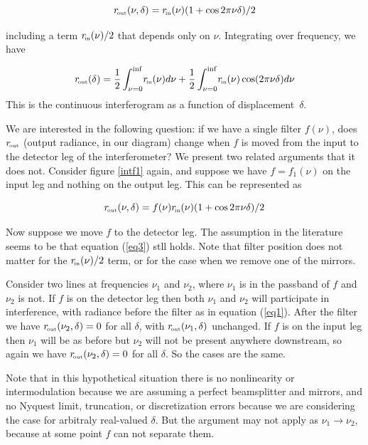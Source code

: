 \documentclass[12pt]{article}
\begin{document}
\begin{equation}\label{eq1}
  r_{\!\mbox{\tiny out}}(\nu,\delta) = r_{\!\mbox{\tiny in}}(\nu)(1+\cos 2\pi\nu\delta)/2
\end{equation}

\noindent
including a term $r_{\!\mbox{\tiny in}}(\nu)/2$ that depends only on $\nu$.
Integrating over frequency, we have

\begin{equation}\label{eq2}
  r_{\!\mbox{\tiny out}}(\delta) = \frac{1}{2}\int_{\nu=0}^{\inf}\!r_{\!\mbox{\tiny in}}(\nu)d\nu + 
     \frac{1}{2}\int_{\nu=0}^{\inf}\!r_{\!\mbox{\tiny in}}(\nu)\cos(2\pi\nu\delta)d\nu
\end{equation}
\noindent
This is the continuous interferogram as a function of
displacement~$\delta$.  

We are interested in the following question: if we have a single
filter $f(\nu)$, does $r_{\!\mbox{\tiny out}}$ (output radiance, in our diagram)
change when $f$ is moved from the input to the detector leg of the
interferometer?  We present two related arguments that it does not.
Consider figure \ref{intf1} again, and suppose we have $f =
f_1(\nu)$ on the input leg and nothing on the output leg.  This can
be represented as

\begin{equation}\label{eq3}
  r_{\!\mbox{\tiny out}}(\nu,\delta) = f(\nu)r_{\!\mbox{\tiny in}}(\nu)(1+\cos 2\pi\nu\delta)/2
\end{equation}

Now suppose we move $f$ to the detector leg.  The assumption in the
literature seems to be that equation (\ref{eq3}) stll holds.  Note
that filter position does not matter for the $r_{\!\mbox{\tiny in}}(\nu)/2$ term, or
for the case when we remove one of the mirrors.

Consider two lines at frequencies $\nu_1$ and $\nu_2$, where $\nu_1$
is in the passband of $f$ and $\nu_2$ is not.  If $f$ is on the
detector leg then both $\nu_1$ and $\nu_2$ will participate in
interference, with radiance before the filter as in equation
(\ref{eq1}).  After the filter we have $r_{\!\mbox{\tiny out}}(\nu_2,\delta) = 0$ for
all $\delta$, with $r_{\!\mbox{\tiny out}}(\nu_1,\delta)$ unchanged.  If $f$ is on
the input leg then $\nu_1$ will be as before but $\nu_2$ will not be
present anywhere downstream, so again we have $r_{\!\mbox{\tiny out}}(\nu_2,\delta) =
0$ for all $\delta$.  So the cases are the same.

Note that in this hypothetical situation there is no nonlinearity or
intermodulation because we are assuming a perfect beamsplitter and
mirrors, and no Nyquest limit, truncation, or discretization errors
because we are considering the case for arbitraly real-valued
$\delta$.  But the argument may not apply as $\nu_1 \rightarrow
\nu_2$, because at some point $f$ can not separate them.
\end{document}
